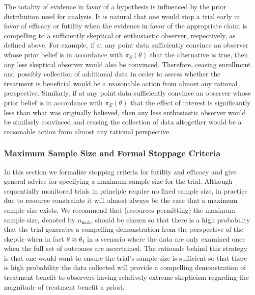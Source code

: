 \documentclass[AMA,STIX1COL,doublespace]{WileyNJD-v2}
\begin{document}
The totality of evidence in favor of a hypothesis is influenced by 
the prior distribution used for analysis.
%
It is natural that one would stop a trial early in favor of efficacy or futility when the evidence in favor of the appropriate claim is compelling
to a sufficiently skeptical or enthusiastic observer, respectively, as defined above.
%
For example, if at any point data sufficiently convince an observer whose prior belief is in accordance with $\pi_{S}(\theta)$ that 
the alternative is true, then any less skeptical observer would also be convinced. Therefore, ceasing enrollment and possibly collection 
of additional data in order to assess whether the treatment is beneficial would be a reasonable action from almost any rational perspective.
%
Similarly, if at any point data sufficiently convince an observer whose prior belief is in accordance with $\pi_{E}(\theta)$ that 
the effect of interest is significantly less than what was originally believed, then any less enthusiastic observer would be similarly convinced and ceasing the collection of data altogether would be a reasonable action from almost any rational perspective.

\subsubsection{Maximum Sample Size and Formal Stoppage Criteria}
In this section we formalize stopping criteria for futility and efficacy and give general 
advice for specifying a maximum sample size for the trial.
%
Although sequentially monitored trials in principle require no fixed sample size, in practice due to resource 
constraints it will almost always be the case that a maximum sample size exists. 
%
We recommend that (resources permitting) the maximum sample size, denoted by $n_{\text{max}}$, should be chosen so that there is a 
high probability that the trial generates a compelling demonstration from the perspective of the skeptic when in 
fact $\theta \approx \theta_1$ in a scenario where the data are only examined once when the full set of 
outcomes are ascertained.
%
The rationale behind this strategy is that one would want to ensure the trial's sample size is sufficient so that
there is high probability the data collected will provide a compelling demonstration of treatment benefit to observers 
having relatively extreme skepticism regarding the magnitude of treatment benefit a priori.  
\end{document}
